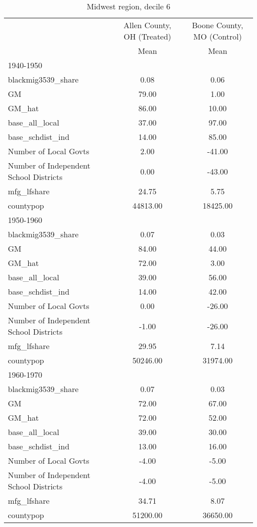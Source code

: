 \begin{table}[htbp]\centering
\def\sym#1{\ifmmode^{#1}\else\(^{#1}\)\fi}
\caption{Midwest region, decile 6 \label{tab1}}
\begin{tabular}{l*{2}{c}}
\toprule
                    &\multicolumn{1}{c}{Allen County, OH (Treated)}&\multicolumn{1}{c}{Boone County, MO (Control)}\\
                    &        Mean&        Mean\\
\midrule
1940-1950           &            &            \\
blackmig3539\_share  &        0.08&        0.06\\
GM                  &       79.00&        1.00\\
GM\_hat              &       86.00&       10.00\\
base\_all\_local      &       37.00&       97.00\\
base\_schdist\_ind    &       14.00&       85.00\\
Number of Local Govts&        2.00&      -41.00\\
Number of Independent School Districts&        0.00&      -43.00\\
mfg\_lfshare         &       24.75&        5.75\\
countypop           &    44813.00&    18425.00\\
\midrule
1950-1960           &            &            \\
blackmig3539\_share  &        0.07&        0.03\\
GM                  &       84.00&       44.00\\
GM\_hat              &       72.00&        3.00\\
base\_all\_local      &       39.00&       56.00\\
base\_schdist\_ind    &       14.00&       42.00\\
Number of Local Govts&        0.00&      -26.00\\
Number of Independent School Districts&       -1.00&      -26.00\\
mfg\_lfshare         &       29.95&        7.14\\
countypop           &    50246.00&    31974.00\\
\midrule
1960-1970           &            &            \\
blackmig3539\_share  &        0.07&        0.03\\
GM                  &       72.00&       67.00\\
GM\_hat              &       72.00&       52.00\\
base\_all\_local      &       39.00&       30.00\\
base\_schdist\_ind    &       13.00&       16.00\\
Number of Local Govts&       -4.00&       -5.00\\
Number of Independent School Districts&       -4.00&       -5.00\\
mfg\_lfshare         &       34.71&        8.07\\
countypop           &    51200.00&    36650.00\\
\bottomrule
\end{tabular}
\end{table}
